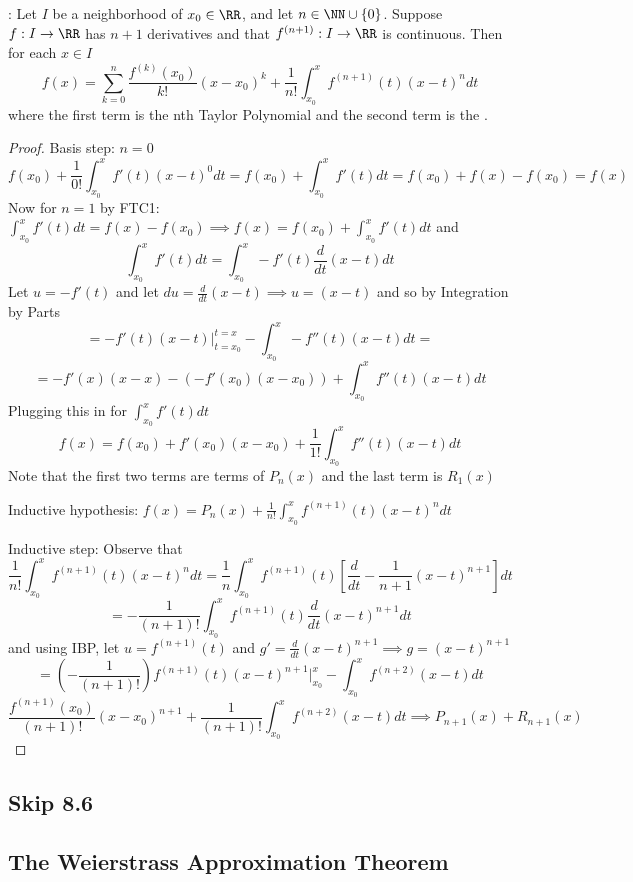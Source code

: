 \documentclass[12pt]{scrartcl}
\begin{document}
\begin{theorem}
  : Let $I$ be a neighborhood of $x_0 \in \RR$, and 
  let $n \in \NN \cup \{0\}$. Suppose $f: I \to \RR$ has $n + 1$ derivatives and that 
  $f^{(n+1)}: I \to \RR$ is continuous. Then for each $x \in I$
  \[f(x) = \sum_{k=0}^n \frac{f^{(k)}(x_0)}{k!}(x-x_0)^k + \frac{1}{n!}\int_{x_0}^x f^{(n+1)}(t)(x-t)^n dt\]
  where the first term is the nth Taylor Polynomial and the second term is the .

  \begin{proof}
    Basis step: $n=0$
    \[f(x_0) + \frac{1}{0!}\int_{x_0}^x f'(t)(x-t)^0 dt = f(x_0) + \int_{x_0}^x f'(t) dt = f(x_0) + f(x) - f(x_0) = f(x)\]
    Now for $n=1$ by FTC1: $\int_{x_0}^x f'(t) dt = f(x) - f(x_0) \implies f(x) = f(x_0) + \int_{x_0}^x f'(t) dt$
    and 
    \[\int_{x_0}^x f'(t) dt = \int_{x_0}^x -f'(t) \frac{d}{dt}(x-t) dt\]
    Let $u = -f'(t)$ and let $du = \frac{d}{dt}(x-t) \implies u = (x-t)$
    and so by Integration by Parts 
    \[= -f'(t) (x-t)\Bigg|_{t=x_0}^{t=x} - \int_{x_0}^x -f''(t) (x-t) dt = \]
    \[= -f'(x)(x-x) - (-f'(x_0)(x-x_0)) + \int_{x_0}^x f''(t) (x-t) dt\]
    Plugging this in for $\int_{x_0}^x f'(t) dt$
    \[f(x) = f(x_0) + f'(x_0)(x-x_0) + \frac{1}{1!}\int_{x_0}^x f''(t) (x-t) dt\]
    Note that the first two terms are terms of $P_n(x)$ and the last term is $R_1(x)$
    
    Inductive hypothesis: $f(x) = P_n(x) + \frac{1}{n!}\int_{x_0}^x f^{(n+1)}(t) (x-t)^n dt$

    Inductive step: Observe that 
    \[\frac{1}{n!}\int_{x_0}^x f^{(n+1)}(t) (x-t)^n dt = \frac{1}{n} \int_{x_0}^x f^{(n+1)}(t) \left[ \frac{d}{dt} -\frac{1}{n+1}(x-t)^{n+1}\right] dt\]
    \[= -\frac{1}{(n+1)!}\int_{x_0}^x f^{(n+1)}(t) \frac{d}{dt}(x-t)^{n+1} dt\]
    and using IBP, let $u = f^{(n+1)}(t)$ and $g' = \frac{d}{dt}(x-t)^{n+1} \implies g = (x-t)^{n+1}$
    \[= (-\frac{1}{(n+1)!}) f^{(n+1)}(t) (x-t)^{n+1}\Bigg|_{x_0}^x - \int_{x_0}^x f^{(n+2)} (x-t) dt\]
    \[\frac{f^{(n+1)}(x_0)}{(n+1)!}(x-x_0)^{n+1} + \frac{1}{(n+1)!}\int_{x_0}^x f^{(n+2)}(x-t) dt \implies P_{n+1}(x) + R_{n+1}(x)\]
  \end{proof}
\end{theorem}

\subsection{Skip 8.6}

\subsection{The Weierstrass Approximation Theorem}
\end{document}

